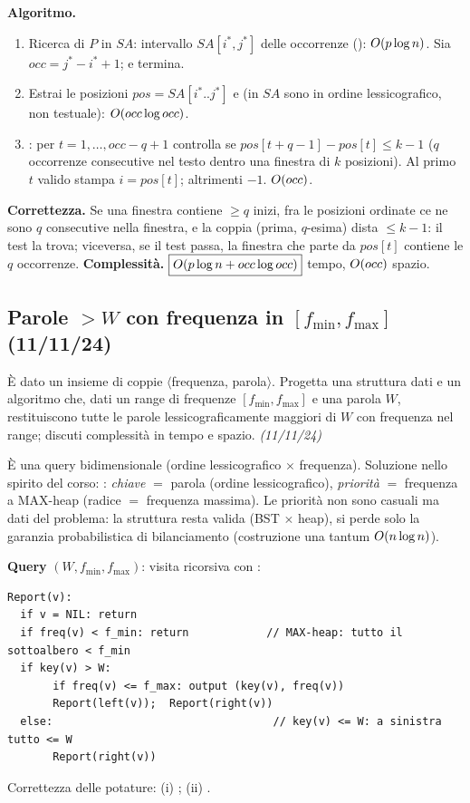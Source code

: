 \textbf{Algoritmo.}
\begin{enumerate}[leftmargin=1.8em,itemsep=1pt]
\item Ricerca di $P$ in $SA$: intervallo $SA[i^{*},j^{*}]$ delle occorrenze ():
$O\!\left(p\log n\right)$. Sia $occ=j^{*}-i^{*}+1$;  e termina.
\item Estrai le posizioni $\mathit{pos}=SA[i^{*}..j^{*}]$ e  (in $SA$ sono in ordine
lessicografico, non testuale): $O\!\left(occ\log occ\right)$.
\item {}: per $t=1,\dots,occ-q+1$ controlla se
$\mathit{pos}[t+q-1]-\mathit{pos}[t]\le k-1$ ($q$ occorrenze consecutive nel testo dentro una
finestra di $k$ posizioni). Al primo $t$ valido stampa $i=\mathit{pos}[t]$; altrimenti $-1$.
$O\!\left(occ\right)$.
\end{enumerate}
\textbf{Correttezza.} Se una finestra contiene $\ge q$ inizi, fra le posizioni ordinate ce ne sono
$q$ consecutive nella finestra, e la coppia (prima, $q$-esima) dista $\le k-1$: il test la trova;
viceversa, se il test passa, la finestra che parte da $\mathit{pos}[t]$ contiene le $q$
occorrenze.
\textbf{Complessit\`a.} $\boxed{O\!\left(p\log n+occ\log occ\right)}$ tempo, $O\!\left(occ\right)$ spazio.

\subsection*{ Parole $>W$ con frequenza in $[f_{\min},f_{\max}]$ (11/11/24)}

\begin{domanda}
\`E dato un insieme di coppie $\langle$frequenza, parola$\rangle$. Progetta una struttura dati e
un algoritmo che, dati un range di frequenze $[f_{\min},f_{\max}]$ e una parola $W$, restituiscono
tutte le parole lessicograficamente maggiori di $W$ con frequenza nel range; discuti
complessit\`a in tempo e spazio. \emph{(11/11/24)}
\end{domanda}

\`E una query bidimensionale (ordine lessicografico $\times$ frequenza). Soluzione nello spirito
del corso: : \emph{chiave} $=$ parola (ordine
lessicografico), \emph{priorit\`a} $=$ frequenza a MAX-heap (radice $=$ frequenza massima). Le
priorit\`a non sono casuali ma dati del problema: la struttura resta valida (BST $\times$ heap),
si perde solo la garanzia probabilistica di bilanciamento (costruzione una tantum
$O\!\left(n\log n\right)$).

\textbf{Query} $(W,f_{\min},f_{\max})$: visita ricorsiva con :
\begin{verbatim}
Report(v):
  if v = NIL: return
  if freq(v) < f_min: return            // MAX-heap: tutto il sottoalbero < f_min
  if key(v) > W:
       if freq(v) <= f_max: output (key(v), freq(v))
       Report(left(v));  Report(right(v))
  else:                                  // key(v) <= W: a sinistra tutto <= W
       Report(right(v))
\end{verbatim}
Correttezza delle potature: (i) ; (ii) .

